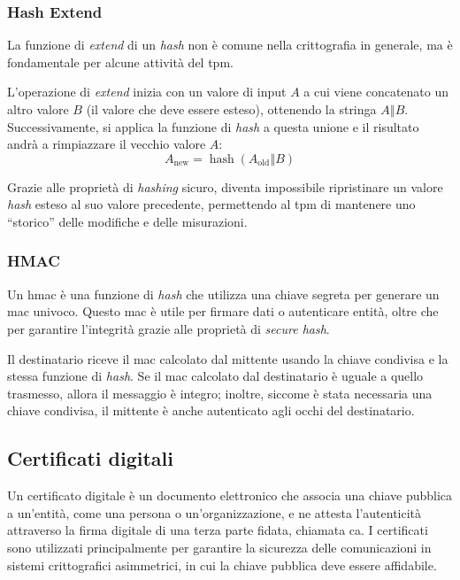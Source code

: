 \subsubsection{Hash Extend}\label{subsubsec:hash_extend}
La funzione di \textit{extend} di un \textit{hash} non è comune nella crittografia in generale, ma è fondamentale per alcune attività del \acrshort{tpm}. 

L'operazione di \textit{extend} inizia con un valore di input $A$ a cui viene concatenato un altro valore $B$ (il valore che deve essere esteso), ottenendo la stringa $A \mathbin{\Vert} B$. Successivamente, si applica la funzione di \textit{hash} a questa unione e il risultato andrà a rimpiazzare il vecchio valore $A$:
\begin{equation}\label{eq:hash_extend}
    A_{\text{new}} = \operatorname{hash}(A_{\text{old}} \mathbin{\Vert} B)
\end{equation}

Grazie alle proprietà di \textit{hashing} sicuro, diventa impossibile ripristinare un valore \textit{hash} esteso al suo valore precedente, permettendo al \acrshort{tpm} di mantenere uno \enquote{storico} delle modifiche e delle misurazioni.


\subsubsection{HMAC}\label{subsubsec:hmac}
Un \acrfull{hmac} è una funzione di \textit{hash} che utilizza una chiave segreta per generare un \acrfull{mac} univoco. Questo \acrshort{mac} è utile per firmare dati o autenticare entità, oltre che per garantire l'integrità grazie alle proprietà di \textit{secure hash}.

Il destinatario riceve il \acrshort{mac} calcolato dal mittente usando la chiave condivisa e la stessa funzione di \textit{hash}. Se il \acrshort{mac} calcolato dal destinatario è uguale a quello trasmesso, allora il messaggio è integro; inoltre, siccome è stata necessaria una chiave condivisa, il mittente è anche autenticato agli occhi del destinatario.


\subsection{Certificati digitali}\label{subsec:certificati_digitali}
Un certificato digitale è un documento elettronico che associa una chiave pubblica a un'entità, come una persona o un'organizzazione, e ne attesta l'autenticità attraverso la firma digitale di una terza parte fidata, chiamata \acrfull{ca}. I certificati sono utilizzati principalmente per garantire la sicurezza delle comunicazioni in sistemi crittografici asimmetrici, in cui la chiave pubblica deve essere affidabile. 

